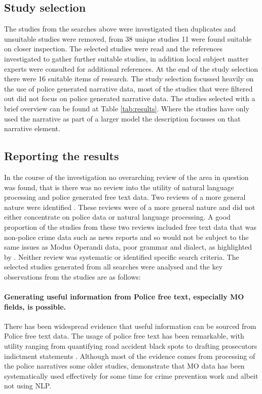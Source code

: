 \subsection{Study selection} The studies from the searches above were investigated then duplicates and unsuitable studies were removed, from 38 unique studies 11 were found suitable on closer inspection. The selected studies were read and the references investigated to gather further suitable studies, in addition local subject matter experts were consulted for additional references. At the end of the study selection there were 16 suitable items of research. The study selection focussed heavily on the use of police generated narrative data, most of the studies that were filtered out did not focus on police generated narrative data. The studies selected with a brief overview can be found at Table \ref{tab:results}. Where the studies have only used the narrative as part of a larger model the description focusses on that narrative element.

\subsection{Reporting the results}

In the course of the investigation no overarching review of the area in question was found, that is there was no review into the utility of natural language processing and police generated free text data. Two reviews of a more general nature were identified \parencite{krishnamurthy2012survey, hassani2016review}. These reviews were of a more general nature and  did not either concentrate on police data or natural language processing. A good proportion of the studies from these two reviews included free text data that was non-police crime data such as news reports and so would not be subject to the same issues as Modus Operandi data, poor grammar and dialect, as highlighted by \textcite{Keyvanpour2011872}. Neither review was systematic or identified specific search criteria. The selected studies generated from all searches were analysed and the key observations from the studies are as follows:


\paragraph{Generating useful information from Police free text, especially MO fields, is possible.} There has been widespread evidence that useful information can be sourced from Police free text data. The usage of police free text has been remarkable, with utility ranging from quantifying road accident black spots \textcite{Krause2019} to drafting prosecutors indictment statements \parencite{chen2010use}. Although most of the evidence comes from processing of the police narratives some older studies, demonstrate that MO data has been systematically used effectively for some time for crime prevention work \textcite{bowers2004commits} and \parencite{adderley2003modus} albeit not using NLP. 


